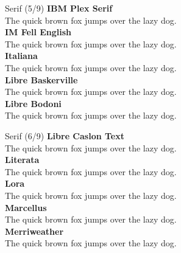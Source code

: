 \documentclass[10pt]{beamer}
\begin{document}
\begin{frame}{Serif (5/9)}
\vspace{-0.2cm}
  {\IBMPlexSerifLocal\Large\bfseries IBM Plex Serif\\}
  {\IBMPlexSerifLocal The quick brown fox jumps over the lazy dog.\\[0.3cm]}
  {\IMFellEnglishLocal\Large\bfseries IM Fell English\\}
  {\IMFellEnglishLocal The quick brown fox jumps over the lazy dog.\\[0.3cm]}
  {\ItalianaLocal\Large\bfseries Italiana\\}
  {\ItalianaLocal The quick brown fox jumps over the lazy dog.\\[0.3cm]}
  {\LibreBaskervilleLocal\Large\bfseries Libre Baskerville\\}
  {\LibreBaskervilleLocal The quick brown fox jumps over the lazy dog.\\[0.3cm]}
  {\LibreBodoniLocal\Large\bfseries Libre Bodoni\\}
  {\LibreBodoniLocal The quick brown fox jumps over the lazy dog.\\[0.3cm]}
\end{frame}

\begin{frame}{Serif (6/9)}
\vspace{-0.2cm}
  {\LibreCaslonTextLocal\Large\bfseries Libre Caslon Text\\}
  {\LibreCaslonTextLocal The quick brown fox jumps over the lazy dog.\\[0.3cm]}
  {\LiterataLocal\Large\bfseries Literata\\}
  {\LiterataLocal The quick brown fox jumps over the lazy dog.\\[0.3cm]}
  {\LoraLocal\Large\bfseries Lora\\}
  {\LoraLocal The quick brown fox jumps over the lazy dog.\\[0.3cm]}
  {\MarcellusLocal\Large\bfseries Marcellus\\}
  {\MarcellusLocal The quick brown fox jumps over the lazy dog.\\[0.3cm]}
  {\MerriweatherLocal\Large\bfseries Merriweather\\}
  {\MerriweatherLocal The quick brown fox jumps over the lazy dog.\\[0.3cm]}
\end{frame}
\end{document}
